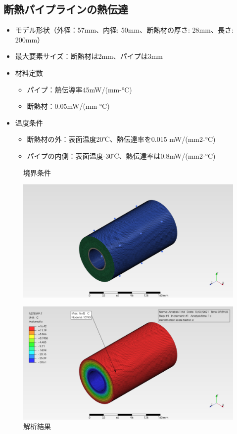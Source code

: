 \documentclass[a4j,20pt,slide]{ltjsarticle}
\begin{document}
\subsection{断熱パイプラインの熱伝達}
\begin{itemize}
	\item モデル形状（外径：57mm、内径: 50mm、断熱材の厚さ: 28mm、長さ: 200mm）
	\item 最大要素サイズ：断熱材は2mm、パイプは3mm
	\item 材料定数
	      \begin{itemize}
		      \item パイプ：熱伝導率45mW/(mm-°C)
		      \item 断熱材：0.05mW/(mm-°C)
	      \end{itemize}
	\item 温度条件
	      \begin{itemize}
		      \item 断熱材の外：表面温度20℃、熱伝達率を0.015 mW/(mm2-°C)
		      \item パイプの内側：表面温度-30℃、熱伝達率は0.8mW/(mm2-°C)
	      \end{itemize}
\end{itemize}
\vspace{-\baselineskip}
\begin{figure}[H]
	\begin{minipage}{.49\hsize}
		\caption{境界条件}
		\label{11-01}
		\centering
		\includegraphics[width=.95\columnwidth]{fig/11-01.png}
	\end{minipage}
	\begin{minipage}{.49\hsize}
		\caption{解析結果}
		\label{11-02}
		\centering
		\includegraphics[width=.95\columnwidth]{fig/11-02.png}
	\end{minipage}
\end{figure}
\clearpage
%
\end{document}
